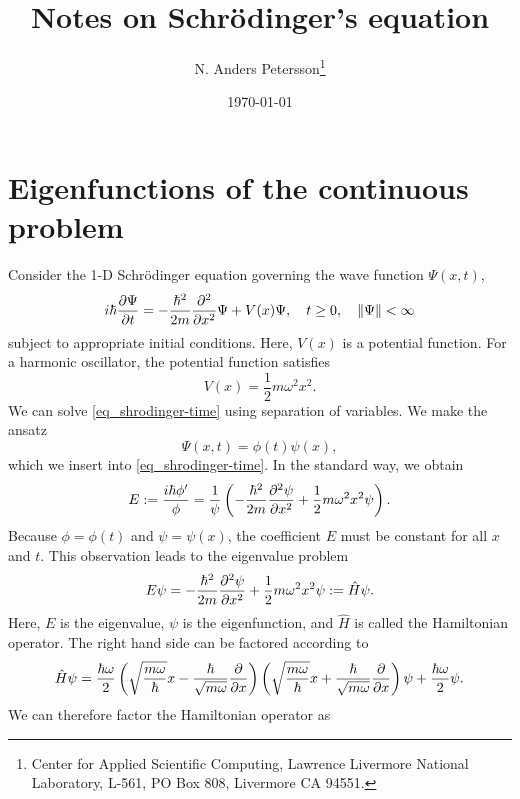 \documentclass[11pt]{article}
\begin{document}
\title{Notes on Schr\"odinger's equation}

\author{N. Anders Petersson\thanks{Center for Applied
    Scientific Computing, Lawrence Livermore National Laboratory, L-561, PO Box 808, Livermore CA
    94551. }}

\date{\today}

\maketitle

\section{Eigenfunctions of the continuous problem}
 Consider the 1-D Schr\"odinger equation governing the wave function $\Psi(x,t)$,
\begin{equation}\label{eq_shrodinger-time}
i\hbar\frac{\partial \Psi}{\partial t} = -\frac{\hbar^2}{2 m} \frac{\partial^2}{\partial x^2} \Psi + V(x) \Psi,\quad t\geq
0,\quad \| \Psi \| < \infty
\end{equation}
subject to appropriate initial conditions. Here, $V(x)$ is a potential function. For a harmonic
oscillator, the potential function satisfies
\[
V(x) = \frac{1}{2}m\omega^2 x^2.
\]
We can solve \eqref{eq_shrodinger-time} using separation of variables. We make the ansatz
\[
\Psi(x,t) = \phi(t) \psi(x),
\]
which we insert into \eqref{eq_shrodinger-time}. In the standard way, we obtain
\begin{equation} \label{eq_const-ratio}
E:= \frac{i\hbar \phi'}{\phi} = \frac{1}{\psi} \left(-\frac{\hbar^2}{2m} \frac{\partial^2\psi}{\partial x^2} +
\frac{1}{2} m \omega^2 x^2 \psi \right).
\end{equation}
Because $\phi=\phi(t)$ and $\psi=\psi(x)$, the coefficient $E$ must be constant for all $x$ and
$t$. This observation leads to the eigenvalue problem
\begin{equation}\label{eq_eigen-problem}
E\psi = -\frac{\hbar^2}{2m} \frac{\partial^2\psi}{\partial x^2} + \frac{1}{2} m \omega^2 x^2 \psi := \hat{H}\psi.
\end{equation}
Here, $E$ is the eigenvalue, $\psi$ is the eigenfunction, and $\hat{H}$ is called the Hamiltonian
operator. The right hand side can be factored according to
\[
\hat{H}\psi = \frac{\hbar\omega}{2}
%
\left(\sqrt{\frac{m\omega}{\hbar}} x - \frac{\hbar}{\sqrt{m\omega}} \frac{\p}{\p x} \right)
%
\left(\sqrt{\frac{m \omega}{\hbar}} x + \frac{\hbar}{\sqrt{m\omega}} \frac{\p}{\p x} \right) \psi +
%
\frac{\hbar \omega}{2} \psi.
\]
We can therefore factor the Hamiltonian operator as
\end{document}
